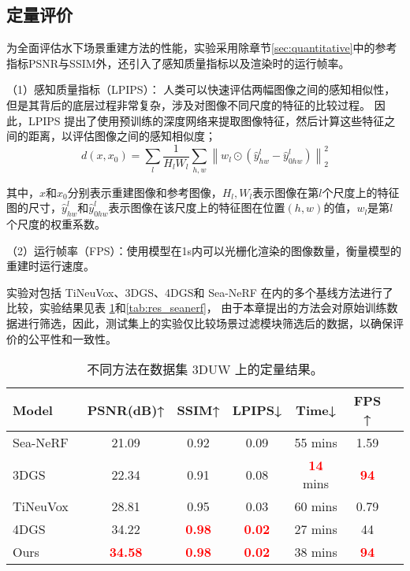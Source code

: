 \subsection{定量评价}
为全面评估水下场景重建方法的性能，实验采用除章节\ref{sec:quantitative}中的参考指标PSNR与SSIM外，还引入了感知质量指标以及渲染时的运行帧率。

（1）感知质量指标（LPIPS）\cite{lpips}： 人类可以快速评估两幅图像之间的感知相似性，但是其背后的底层过程非常复杂，涉及对图像不同尺度的特征的比较过程。
因此，LPIPS 提出了使用预训练的深度网络来提取图像特征，然后计算这些特征之间的距离，以评估图像之间的感知相似度；
\begin{equation}
    d(x, x_0) = \sum_{l} \frac{1}{H_l W_l} \sum_{h,w} \left\| w_l \odot (\hat{y}^l_{hw} - \hat{y}^l_{0hw}) \right\|_2^2
\end{equation}

其中，$x$和$x_0$分别表示重建图像和参考图像，$H_l,W_l$表示图像在第$l$个尺度上的特征图的尺寸，$\hat{y}^l_{hw}$和$\hat{y}^l_{0hw}$表示图像在该尺度上的特征图在位置$(h, w)$的值，$w_l$是第$l$个尺度的权重系数。

（2）运行帧率（FPS）：使用模型在1s内可以光栅化渲染的图像数量，衡量模型的重建时运行速度。

实验对包括 TiNeuVox\cite{tineuvox}、3DGS\cite{3DGS}、4DGS\cite{4DGS}和 Sea-NeRF\cite{seathru}
在内的多个基线方法进行了比较，实验结果见表 \ref{tab:res_3duw}和\ref{tab:res_seanerf}，
由于本章提出的方法会对原始训练数据进行筛选，因此，测试集上的实验仅比较场景过滤模块筛选后的数据，以确保评价的公平性和一致性。

\begin{table} [htbp]
    \small
    \centering
    \caption{不同方法在数据集 3DUW 上的定量结果。}
    \setlength{\tabcolsep}{10pt}
    \begin{tabular}{lcccccc} 
    \toprule
    Model  & PSNR(dB)↑ & SSIM↑ & LPIPS↓ & Time↓ &  FPS ↑  \\
    \midrule  
    Sea-NeRF\cite{seathru} & 21.09& 0.92 & 0.09 & 55 mins & 1.59\\
    3DGS~\cite{3DGS} &22.34 & 0.91 & 0.08 & \textcolor{red}{\textbf{14}} mins  & \textcolor{red}{\textbf{94}}\\
    TiNeuVox~\cite{tineuvox}  & 28.81 & 0.95 &  0.03 & 60 mins & 0.79\\ 
    4DGS\cite{4DGS} & 34.22&\textcolor{red}{\textbf{0.98}} &\textcolor{red}{\textbf{0.02}}& 27 mins&44 \\
    Ours & \textcolor{red}{\textbf{34.58}} & \textcolor{red}{\textbf{0.98}} & \textcolor{red}{\textbf{0.02}} & 38 mins & \textcolor{red}{\textbf{94}}\\
    \bottomrule
    \end{tabular}  
    \label{tab:res_3duw}
\end{table}
    
